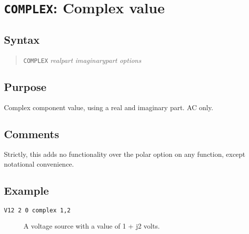 %
%
%
%
\section{{\tt COMPLEX}: Complex value}
\subsection{Syntax}
\begin{verse}
{\tt COMPLEX} {\it realpart imaginarypart options}
\end{verse}
\subsection{Purpose}

Complex component value, using a real and imaginary part.  AC only.
\subsection{Comments}

Strictly, this adds no functionality over the polar option on any
function, except notational convenience.
\subsection{Example} 

\begin{description}

\item [{\tt V12 2 0 complex 1,2}] A voltage source with a value of 1 + j2
volts.

\end{description}

